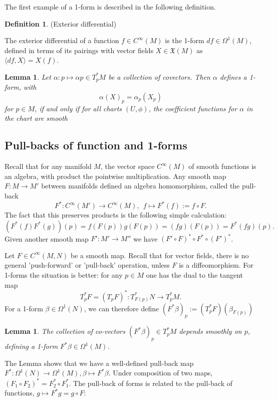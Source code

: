 \documentclass{article}
\newtheorem{lemma}[theorem]{Lemma}
\theoremstyle{definition}
\newtheorem{defn}[theorem]{Definition}
\newenvironment{definition}
  {\vspace{8pt}\begin{mdframed}[backgroundcolor=blueish,innertopmargin=4]\begin{defn}}
  {\end{defn}\end{mdframed}\vspace{4pt}}
\begin{document}
The first example of a 1-form is described in the following definition.

\begin{definition} (Exterior differential)

The exterior differential of a function $f \in C^\infty(M)$ is the 1-form $d f \in \Omega^1 (M)$, defined in terms of its pairings with vector fields $X \in \mathfrak X(M)$ as $\langle d f, X\rangle = X(f)$.
\end{definition}


\begin{lemma}
Let $\alpha : p \mapsto \alpha p \in T^*_p M$ be a collection of covectors. Then $\alpha$ defines a 1-form, with 
\[
    \alpha(X)_p = \alpha_p(X_p)
\]
for $p \in M$, if and only if for all charts $(U,\phi)$, the coefficient functions for $\alpha$ in the chart are smooth
\end{lemma}

\subsection{Pull-backs of function and 1-forms}

Recall that for any manifold $M$, the vector space $C^\infty(M)$ of smooth functions is an algebra, with product the pointwise multiplication. Any smooth map $F : M \rightarrow M'$ between manifolds defined an algebra homomorphism, called the pull-back
\[
    F^* : C^\infty (M') \rightarrow C^\infty (M), \ \ f \mapsto F ^* (f) := f \circ F. 
\]
The fact that this preserves products is the following simple calculation: 
\[
(F^* (f)F^* (g))(p) = f(F(p))g(F(p)) = (f g)(F(p)) = F^* (f g)(p).
\]
Given another smooth map $F' : M' \rightarrow M''$ we have $(F'\circ F)^* \circ F^* \circ (F' )^*$.

Let $F \in C^\infty(M,N)$ be a smooth map. Recall that for vector fields, there is no general 'push-forward' or 'pull-back' operation, unless $F$ is a diffeomorphism. For 1-forms the situation is better: for any $p \in M$ one has the dual to the tangent map 
\[
    T^*_p F = (T_pF)^* : T^*_{F(p)}N \rightarrow T^*_p M.
\]
For a 1-form $\beta \in \Omega^1 (N)$, we can therefore define $(F^* \beta)_p := (T^*_p F)(\beta_{F(p)})$

\begin{lemma}
The collection of co-vectors $(F^*\beta)_p \in T^*_p M$ depends smoothly on $p$, defining a 1-form $F^*\beta \in \Omega^1 (M)$.
\end{lemma}

The Lemma shows that we have a well-defined pull-back map $F^* : \Omega^1 (N) \rightarrow \Omega^1  (M), \beta \mapsto F^* \beta$. Under composition of two maps, $(F_1 \circ F_2)^* = F^*_2 \circ F^*_1 $. The pull-back of forms is related to the pull-back of functions, $g \mapsto F^*g = g \circ F$:
\end{document}
